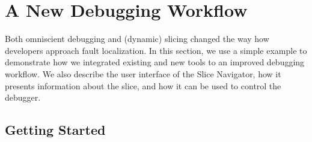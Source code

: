 %
%

\section{A New Debugging Workflow}
\label{sec:workflow}

Both omniscient debugging and (dynamic) slicing changed the way how developers approach fault localization.
In this section, we use a simple example to demonstrate how we integrated existing and new tools to an improved debugging workflow.
We also describe the user interface of the Slice Navigator, how it presents information about the slice, and how it can be used to control the debugger.

\subsection{Getting Started}
\label{lst:example}

